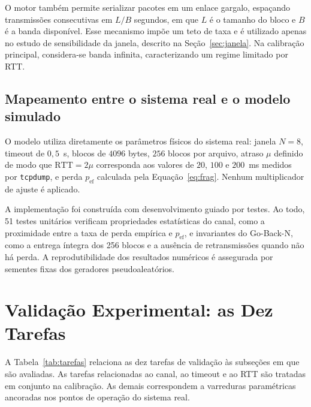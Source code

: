 \documentclass[12pt]{article}
\begin{document}
O motor também permite serializar pacotes em um enlace gargalo, espaçando transmissões
consecutivas em $L/B$ segundos, em que $L$ é o tamanho do bloco e $B$ é a banda disponível.
Esse mecanismo impõe um teto de taxa e é utilizado apenas no estudo de sensibilidade da
janela, descrito na Seção~\ref{sec:janela}. Na calibração principal, considera-se banda
infinita, caracterizando um regime limitado por RTT.

\subsection{Mapeamento entre o sistema real e o modelo simulado}
\label{sec:mapeamento}

O modelo utiliza diretamente os parâmetros físicos do sistema real: janela $N=8$, timeout
de $0{,}5$~s, blocos de $4096$ bytes, $256$ blocos por arquivo, atraso $\mu$ definido de
modo que $\text{RTT}=2\mu$ corresponda aos valores de $20$, $100$ e $200$~ms medidos por
\texttt{tcpdump}, e perda $p_{\text{ef}}$ calculada pela Equação~\ref{eq:frag}. Nenhum
multiplicador de ajuste é aplicado.

A implementação foi construída com desenvolvimento guiado por testes. Ao todo, 51 testes
unitários verificam propriedades estatísticas do canal, como a proximidade entre a taxa de
perda empírica e $p_{\text{ef}}$, e invariantes do Go-Back-N, como a entrega íntegra dos
256 blocos e a ausência de retransmissões quando não há perda. A reprodutibilidade dos
resultados numéricos é assegurada por sementes fixas dos geradores pseudoaleatórios.

\section{Validação Experimental: as Dez Tarefas}
\label{sec:validacao}

A Tabela~\ref{tab:tarefas} relaciona as dez tarefas de validação às subseções em que são
avaliadas. As tarefas relacionadas ao canal, ao timeout e ao RTT são tratadas em conjunto
na calibração. As demais correspondem a varreduras paramétricas ancoradas nos pontos de
operação do sistema real.
\end{document}
